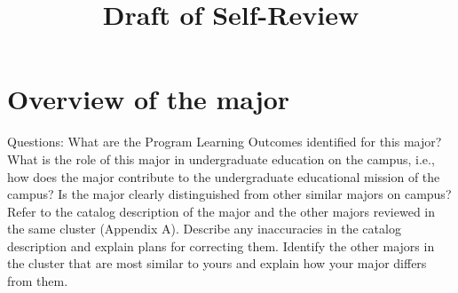 \documentclass[12pt]{article}
\begin{document}


\title{Draft of Self-Review}

\maketitle

\section{Overview of the major}

Questions: What are the Program Learning Outcomes identified for this major? {\color{red} What is the role of this major in undergraduate education on the campus, i.e., how does the major contribute to the undergraduate educational mission of the campus? Is the major clearly distinguished from other similar majors on campus?\\

Refer to the catalog description of the major and the other majors reviewed in the same cluster (Appendix A). Describe any inaccuracies in the catalog description and explain plans for correcting them. Identify the other majors in the cluster that are most similar to yours and explain how your major differs from them.}\\[5pt]
\end{document}
